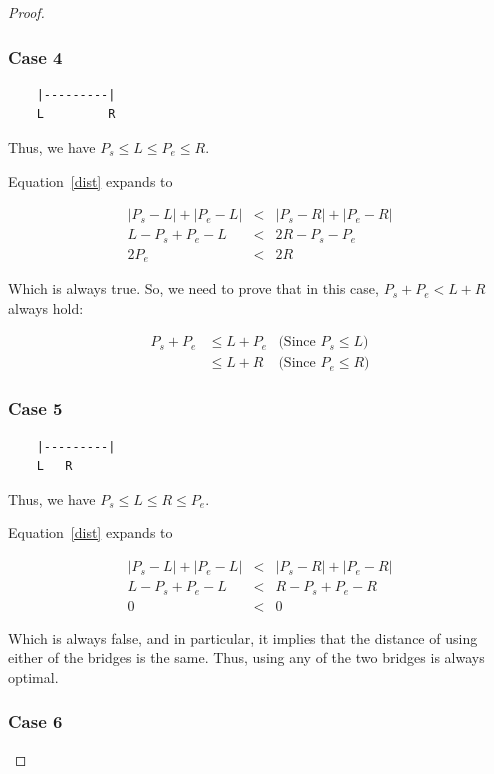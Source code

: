 \documentclass[a4paper]{article}
\begin{document}
\begin{proof}
	\subsubsection*{Case 4}
	
	\begin{verbatim}
	|---------|
	L         R
	\end{verbatim}
	
	Thus, we have $P_s \le L \le P_e \le R$.
	
	Equation~\ref{dist} expands to
	
	\begin{eqnarray*}
		|P_s - L| + |P_e - L| &<& |P_s - R| + |P_e - R| \\
		L - P_s + P_e - L &<& 2R - P_s - P_e \\
		2P_e &<& 2R
	\end{eqnarray*}
	
	Which is always true. So, we need to prove that in this case,
	$P_s + P_e < L+R$ always hold:
	
	\begin{eqnarray*}
		P_s + P_e &\le L + P_e & \text{(Since $P_s \le L$)} \\
		&\le L + R & \text{(Since $P_e \le R$)}
	\end{eqnarray*}
	
	\subsubsection*{Case 5}
	
	\begin{verbatim}
	|---------|
	L   R
	\end{verbatim}
	
	Thus, we have $P_s \le L \le R \le P_e$.
	
	Equation~\ref{dist} expands to
	
	\begin{eqnarray*}
		|P_s - L| + |P_e - L| &<& |P_s - R| + |P_e - R| \\
		L - P_s + P_e - L &<& R - P_s + P_e - R \\
		0 &<& 0
	\end{eqnarray*}
	
	Which is always false, and in particular, it implies that the distance
	of using either of the bridges is the same. Thus, using any of the two
	bridges is always optimal.
	
	\subsubsection*{Case 6}
	

\end{proof}
\end{document}
